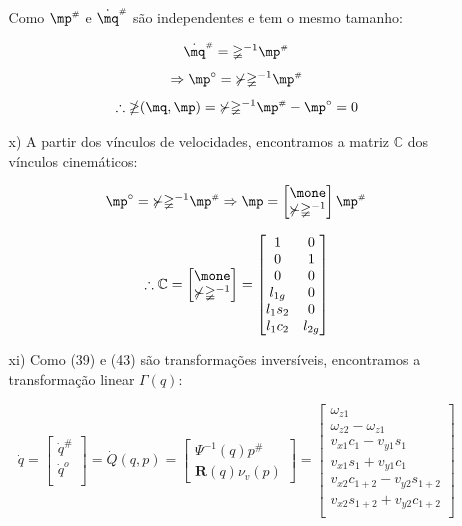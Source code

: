 \begin{itemize}
\begin{itemize}
	Como $\mp\ssh$ e $\dot{\mq}\ssh$ s\~ao independentes e tem o mesmo tamanho:

	$$ \dot{\mq}\ssh = \mathbb{\Psi}^{-1} \mp\ssh $$
	$$ \Rightarrow  \mp^\circ = \mathbb{\Upsilon} \mathbb{\Psi}^{-1} \mp\ssh $$
	\begin{equation}
	\therefore \mathbb{\Lambda}(\mq,\mp) = \mathbb{\Upsilon} \mathbb{\Psi}^{-1} \mp\ssh - \mp^\circ  = 0
	\end{equation}
	
	\item[x)] A partir dos v\'inculos de velocidades, encontramos a matriz $\mathbb{C}$ dos v\'inculos cinem\'aticos:
	
	$$ \mp^\circ = \mathbb{\Upsilon} \mathbb{\Psi}^{-1} \mp\ssh \Rightarrow \mp =
	\begin{bmatrix}
	\mone\\
	\mathbb{\Upsilon} \mathbb{\Psi}^{-1}
	\end{bmatrix}
	\mp\ssh
	$$
	
	\begin{equation}
	\therefore \mathbb{C} =
	\begin{bmatrix}
	\mone\\
	\mathbb{\Upsilon} \mathbb{\Psi}^{-1}
	\end{bmatrix}
	=
	\begin{bmatrix}
	1 & 0 \\
	0 & 1 \\
	0 & 0 \\
	l_{1g} & 0\\
	l_1 s_{2} & 0 \\
	l_1 c_{2} & l_{2g} \\
	\end{bmatrix}
	\end{equation}
	
	\item[xi)] Como (39) e (43) são transforma\c{c}\~oes invers\'iveis, encontramos a transforma\c{c}\~ao linear $\Gamma(q)$:
	
	\begin{equation}
	\dot{q} =
	\begin{bmatrix}
	\dot{q}^{\#} \\
	\dot{q}^o \\
	\end{bmatrix}
	= \dot{Q}(q,p) =
	\begin{bmatrix}
	\Psi^{-1} (q) p^{\#} \\
	\mathbf{R} (q) \nu_v (p)
	\end{bmatrix}
	=
	\begin{bmatrix}
	\omega_{z1} \\
	\omega_{z2}-\omega_{z1}\\
	v_{x1} c_1 - v_{y1} s_1 \\
	v_{x1} s_1 + v_{y1} c_1 \\
	v_{x2} c_{1+2} - v_{y2} s_{1+2} \\
	v_{x2} s_{1+2} + v_{y2} c_{1+2} \\
	\end{bmatrix}
	\end{equation}
	

\end{itemize}
\end{itemize}
